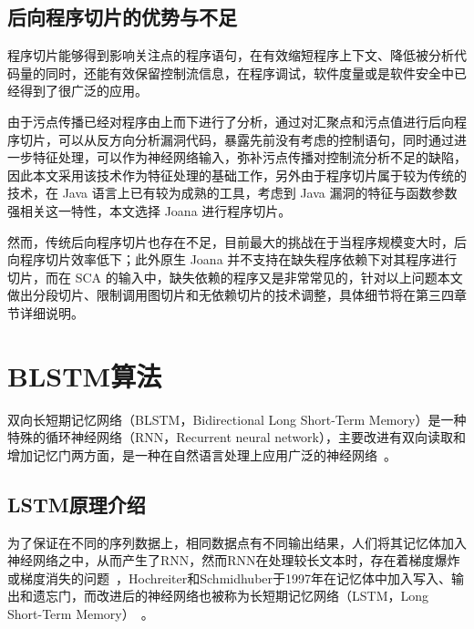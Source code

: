 \subsection{后向程序切片的优势与不足}
程序切片能够得到影响关注点的程序语句，在有效缩短程序上下文、降低被分析代码量的同时，还能有效保留控制流信息，在程序调试，软件度量或是软件安全中已经得到了很广泛的应用。

由于污点传播已经对程序由上而下进行了分析，通过对汇聚点和污点值进行后向程序切片，可以从反方向分析漏洞代码，暴露先前没有考虑的控制语句，同时通过进一步特征处理，可以作为神经网络输入，弥补污点传播对控制流分析不足的缺陷，因此本文采用该技术作为特征处理的基础工作，另外由于程序切片属于较为传统的技术，在 Java 语言上已有较为成熟的工具，考虑到 Java 漏洞的特征与函数参数强相关这一特性，本文选择 Joana 进行程序切片。

然而，传统后向程序切片也存在不足，目前最大的挑战在于当程序规模变大时，后向程序切片效率低下；此外原生 Joana 并不支持在缺失程序依赖下对其程序进行切片，而在 SCA 的输入中，缺失依赖的程序又是非常常见的，针对以上问题本文做出分段切片、限制调用图切片和无依赖切片的技术调整，具体细节将在第三四章节详细说明。

\section{BLSTM算法}
双向长短期记忆网络（BLSTM，Bidirectional Long Short-Term Memory）是一种特殊的循环神经网络（RNN，Recurrent neural network），主要改进有双向读取和增加记忆门两方面，是一种在自然语言处理上应用广泛的神经网络~\cite{lstm:translate}。

\subsection{LSTM原理介绍}
为了保证在不同的序列数据上，相同数据点有不同输出结果，人们将其记忆体加入神经网络之中，从而产生了RNN，然而RNN在处理较长文本时，存在着梯度爆炸或梯度消失的问题~\cite{lstm:gradient}，Hochreiter和Schmidhuber于1997年在记忆体中加入写入、输出和遗忘门，而改进后的神经网络也被称为长短期记忆网络（LSTM，Long Short-Term Memory）~\cite{lstm:1997}。

